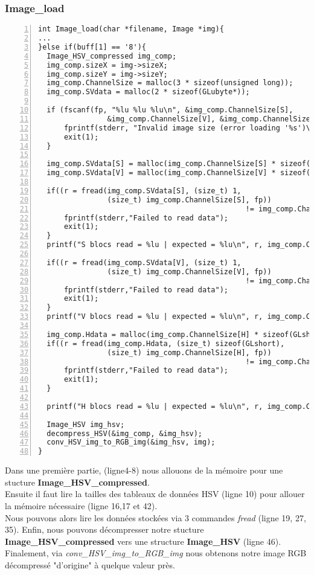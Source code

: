 \documentclass[12pt, letterpaper]{article}
\begin{document}
\subsubsection{Image\_load}
\begin{Verbatim}[numbers=left,xleftmargin = 5mm]
int Image_load(char *filename, Image *img){
...
}else if(buff[1] == '8'){
  Image_HSV_compressed img_comp;
  img_comp.sizeX = img->sizeX;
  img_comp.sizeY = img->sizeY;
  img_comp.ChannelSize = malloc(3 * sizeof(unsigned long));
  img_comp.SVdata = malloc(2 * sizeof(GLubyte*));

  if (fscanf(fp, "%lu %lu %lu\n", &img_comp.ChannelSize[S], 
                &img_comp.ChannelSize[V], &img_comp.ChannelSize[H]) != 3){
      fprintf(stderr, "Invalid image size (error loading '%s')\n", filename);
      exit(1);
  }
  
  img_comp.SVdata[S] = malloc(img_comp.ChannelSize[S] * sizeof(GLubyte));
  img_comp.SVdata[V] = malloc(img_comp.ChannelSize[V] * sizeof(GLubyte));
  
  if((r = fread(img_comp.SVdata[S], (size_t) 1, 
                (size_t) img_comp.ChannelSize[S], fp)) 
                                                != img_comp.ChannelSize[S] ){
      fprintf(stderr,"Failed to read data");
      exit(1);
  }
  printf("S blocs read = %lu | expected = %lu\n", r, img_comp.ChannelSize[S]);

  if((r = fread(img_comp.SVdata[V], (size_t) 1, 
                (size_t) img_comp.ChannelSize[V], fp))
                                                != img_comp.ChannelSize[V] ){
      fprintf(stderr,"Failed to read data");
      exit(1);
  }
  printf("V blocs read = %lu | expected = %lu\n", r, img_comp.ChannelSize[V]);

  img_comp.Hdata = malloc(img_comp.ChannelSize[H] * sizeof(GLshort));
  if((r = fread(img_comp.Hdata, (size_t) sizeof(GLshort),
                (size_t) img_comp.ChannelSize[H], fp))
                                                != img_comp.ChannelSize[H]){
      fprintf(stderr,"Failed to read data");
      exit(1);
  }

  printf("H blocs read = %lu | expected = %lu\n", r, img_comp.ChannelSize[H]);

  Image_HSV img_hsv;
  decompress_HSV(&img_comp, &img_hsv);
  conv_HSV_img_to_RGB_img(&img_hsv, img);
}

\end{Verbatim}
Dans une première partie, (ligne4-8) nous allouons de la mémoire pour une stucture
\textbf{Image\_HSV\_compressed}.\\
Ensuite il faut lire la tailles des tableaux de données HSV (ligne 10) pour allouer la mémoire nécessaire (ligne 16,17 et 42).\\
Nous pouvons alors lire les données stockées via 3 commandes \textit{fread} (ligne 19, 27, 35).
Enfin, nous pouvons décompresser notre stucture \\\textbf{Image\_HSV\_compressed} vers une structure \textbf{Image\_HSV} (ligne 46).\\
Finalement, via \textit{conv\_HSV\_img\_to\_RGB\_img} nous obtenons notre image RGB décompressé "d'origine" à quelque valeur près.
\end{document}

